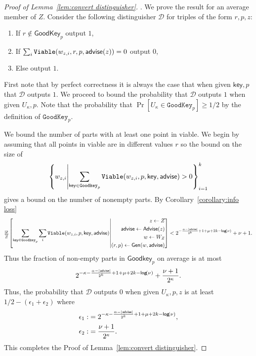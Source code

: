 \begin{proof}[Proof of Lemma~\ref{lem:convert distinguisher}].
We prove the result for an average member of $Z$.
Consider the following distinguisher $\mathcal{D}$ for triples of the form $r, p, z$:
\begin{enumerate}
\item If $r \not\in \mathsf{GoodKey}_p$ output $1$,
\item If $\sum_{i} \mathtt{Viable}(w_{z, i}, r, p, {\mathsf{advise}}(z)) =0 $ output $0$,
\item Else output $1$.
\end{enumerate}
First note that by perfect correctness it is always the case that when given $\mathsf{key}, p$ that $\mathcal{D}$ outputs $1$.  We proceed to bound the probability that $\mathcal{D}$ outputs $1$ when given $U_\kappa, p$.  Note that the probability that $\Pr[U_\kappa \in \mathtt{GoodKey}_p] \ge 1/2$ by the definition of $\mathtt{GoodKey}_p$. 

We bound the number of parts with at least one point in viable.  We begin by assuming that all points in viable are in different  values $r$ so the bound on the size of 
\[
\left\{w_{z, i} \middle|\sum_{\mathsf{key}\in\mathtt{Goodkey}_p} \mathtt{Viable}(w_{z,i}, p, \mathsf{key}, {\mathsf{advise}})>0\right\}_{i=1}^k 
\] 
gives a bound on the number of nonempty parts. By Corollary~\ref{corollary:info loss} 
\[
\operatorname*{\mathbb{E}}_{Z} \left[\sum_{\mathsf{key} \in \mathtt{Goodkey}_p}\sum_{i }  \mathtt{Viable}(w_{z,i}, p, \mathsf{key}, {\mathsf{advise}}) \middle| \begin{aligned} z\leftarrow Z\\ {\mathsf{advise}}\leftarrow {\ensuremath{\mathsf{Advise}}}(z)\\w\leftarrow W_Z\\(r, p)\leftarrow {\ensuremath{\mathsf{Gen}}}(w, {\mathsf{advise}})\end{aligned} \right]< 2^{-\frac{\alpha-|{\mathsf{advise}}|}{2^k}+1+\mu+2k-\mathsf{log}\!\left(\nu\right)}+\nu+1.
\]
Thus the fraction of non-empty parts in $\mathsf{Goodkey}_p$ on average is at most 
\[
2^{-\kappa-\frac{\alpha-|{\mathsf{advise}}|}{2^k}+1+\mu+2k-\mathsf{log}\!\left(\nu\right)}+\frac{\nu+1}{2^\kappa}.
\]
Thus, the probability that $\mathcal{D}$ outputs $0$ when given $U_\kappa, p, z$ is at least 
$1/2-(\epsilon_1+\epsilon_2)$
where 
\begin{align*}
\epsilon_1:&=2^{-\kappa-\frac{\alpha-|{\mathsf{advise}}|}{2^k}+1+\mu+2k-\mathsf{log}\!\left(\nu\right)},\\
\epsilon_2:&=\frac{\nu+1}{2^{\kappa}}.
\end{align*}
\noindent
This completes the Proof of Lemma~\ref{lem:convert distinguisher}.
\end{proof}

